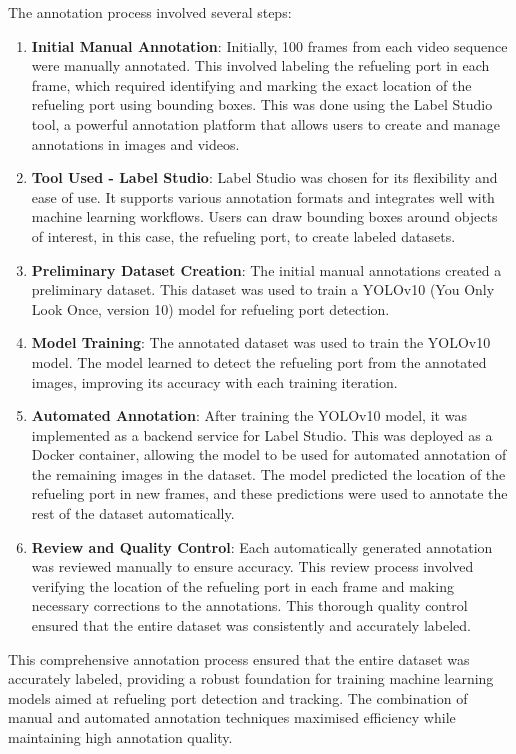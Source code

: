 \documentclass[12pt,oneside]{book} %
\begin{document}
The annotation process involved several steps:
\begin{enumerate}
    \item \textbf{Initial Manual Annotation}: Initially, 100 frames from each video sequence were manually annotated. This involved labeling the refueling port in each frame, which required identifying and marking the exact location of the refueling port using bounding boxes. This was done using the Label Studio tool, a powerful annotation platform that allows users to create and manage annotations in images and videos.
    \item \textbf{Tool Used - Label Studio}: Label Studio was chosen for its flexibility and ease of use. It supports various annotation formats and integrates well with machine learning workflows. Users can draw bounding boxes around objects of interest, in this case, the refueling port, to create labeled datasets.
    \item \textbf{Preliminary Dataset Creation}: The initial manual annotations created a preliminary dataset. This dataset was used to train a YOLOv10 (You Only Look Once, version 10) model for refueling port detection.
    \item \textbf{Model Training}: The annotated dataset was used to train the YOLOv10 model. The model learned to detect the refueling port from the annotated images, improving its accuracy with each training iteration.
    \item \textbf{Automated Annotation}: After training the YOLOv10 model, it was implemented as a backend service for Label Studio. This was deployed as a Docker container, allowing the model to be used for automated annotation of the remaining images in the dataset. The model predicted the location of the refueling port in new frames, and these predictions were used to annotate the rest of the dataset automatically.
    \item \textbf{Review and Quality Control}: Each automatically generated annotation was reviewed manually to ensure accuracy. This review process involved verifying the location of the refueling port in each frame and making necessary corrections to the annotations. This thorough quality control ensured that the entire dataset was consistently and accurately labeled.
\end{enumerate}

This comprehensive annotation process ensured that the entire dataset was
accurately labeled, providing a robust foundation for training machine learning
models aimed at refueling port detection and tracking. The combination of
manual and automated annotation techniques maximised efficiency while
maintaining high annotation quality.
\end{document}

